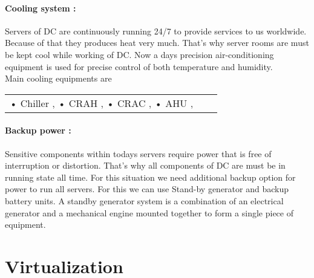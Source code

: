 \documentclass[12pt,a4paper]{report}
\begin{document}
\subsubsection{Cooling system :}
Servers of DC are continuously running 24/7 to provide services to us worldwide. Because of that they produces heat very much. That's why server rooms are must be kept cool while working of DC. Now a days precision air-conditioning equipment is used for precise control of both temperature and humidity.\\ 
Main cooling equipments are\\
\begin{tabular}{lll}
\vspace*{0.1 in}
•	Chiller ,
\vspace*{0.1 in}
•	CRAH ,
\vspace*{0.1 in}
•	CRAC ,
\vspace*{0.1 in}
•	AHU ,
\end{tabular}
\subsubsection{Backup power :}
Sensitive components within todays servers require power that is free of interruption or distortion. That’s why all components of DC are must be in running state all time. For this situation we need additional backup option for power to run all servers. For this we can use Stand-by generator and backup battery units. A standby generator system is a combination of an electrical generator and a mechanical engine mounted together to form a single piece of equipment. 





\chapter{Virtualization}
\end{document}
